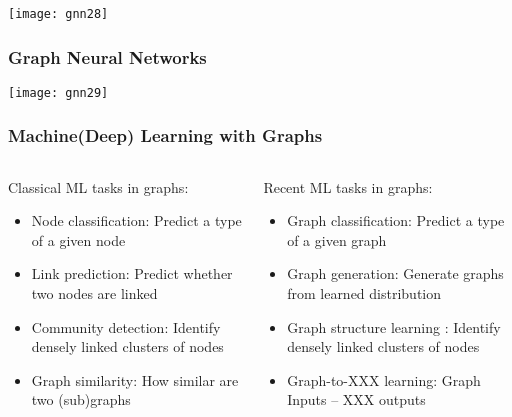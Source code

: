 \begin{frame}[fragile]\frametitle{}

\begin{center}
\texttt{[image: gnn28]}
\end{center}	  

\end{frame}

\begin{frame}[fragile]\frametitle{Graph Neural Networks}

\begin{center}
\texttt{[image: gnn29]}
\end{center}	  

\end{frame}

\begin{frame}[fragile]\frametitle{Machine(Deep) Learning with Graphs}
\begin{columns}
    \begin{column}[T]{0.6\linewidth}
		Classical ML tasks in graphs:

    \begin{itemize}
		\item Node classification: Predict a type of a given node
		\item Link prediction: Predict whether two nodes are linked
		\item Community detection: Identify densely linked clusters of nodes
		\item Graph similarity: How similar are two (sub)graphs
	  \end{itemize}

    \end{column}
    \begin{column}[T]{0.4\linewidth}
		Recent ML tasks in graphs:
		
    \begin{itemize}
		\item Graph classification: Predict a type of a given graph
		\item Graph generation: Generate graphs from learned distribution
		\item Graph structure learning : Identify densely linked clusters of nodes
		\item Graph-to-XXX learning: Graph Inputs – XXX outputs
	  \end{itemize} 
		
    \end{column}
  \end{columns}
\end{frame}

